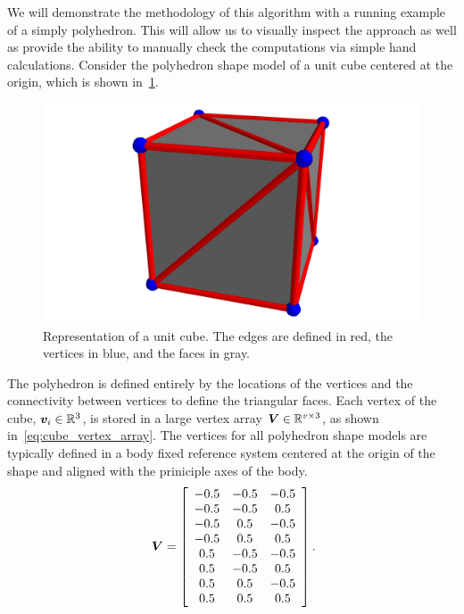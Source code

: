 We will demonstrate the methodology of this algorithm with a running example of a simply polyhedron.
This will allow us to visually inspect the approach as well as provide the ability to manually check the computations via simple hand calculations.
Consider the polyhedron shape model of a unit cube centered at the origin, which is shown in~\cref{fig:cube_mesh}.
\begin{figure}
    \centering
    \includegraphics[width=\textwidth]{figures/computational_geometry/cube_mesh.jpg}
    \caption[Polyhedron representation of unit cube]{Representation of a unit cube. The edges are defined in red, the vertices in blue, and the faces in gray.~\label{fig:cube_mesh}}
\end{figure}
The polyhedron is defined entirely by the locations of the vertices and the connectivity between vertices to define the triangular faces.
Each vertex of the cube, \( \bm{v}_i \in \mathbb{R}^3\), is stored in a large vertex array \( \bm{V} \in \mathbb{R}^{v \times 3} \), as shown in~\cref{eq:cube_vertex_array}.
The vertices for all polyhedron shape models are typically defined in a body fixed reference system centered at the origin of the shape and aligned with the priniciple axes of the body.
\begin{align}~\label{eq:cube_vertex_array}
    \bm{V} = \begin{bmatrix}
        \begin{array}{ccc}
        -0.5 & -0.5 & -0.5 \\
        -0.5 & -0.5 & 0.5  \\
        -0.5 & 0.5  & -0.5 \\
        -0.5 & 0.5  & 0.5  \\
        0.5  & -0.5 & -0.5 \\
        0.5  & -0.5 & 0.5  \\
        0.5  & 0.5  & -0.5 \\
        0.5  & 0.5  & 0.5
    \end{array}
   \end{bmatrix}.
\end{align}
